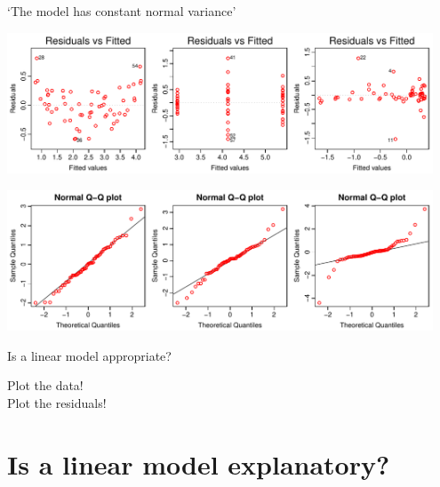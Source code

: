 \documentclass[xcolor=x11names,compress]{beamer}
\renewcommand{\(}{\begin{columns}}
\renewcommand{\)}{\end{columns}}
\newcommand{\<}[1]{\begin{column}{#1}}
\renewcommand{\>}{\end{column}}
\begin{document}

\begin{frame}{`The model has constant normal variance'}

\includegraphics[width=0.95\textwidth]{BadFitResid.pdf}

\includegraphics[width=0.95\textwidth]{BadQQNorm.pdf}


\end{frame}


\begin{frame}{Is a linear model appropriate?}

\begin{center} 
    \Huge
Plot the data!\\
Plot the residuals!
\end{center}

\end{frame}


\section{Is a linear model explanatory?}
\end{document}
